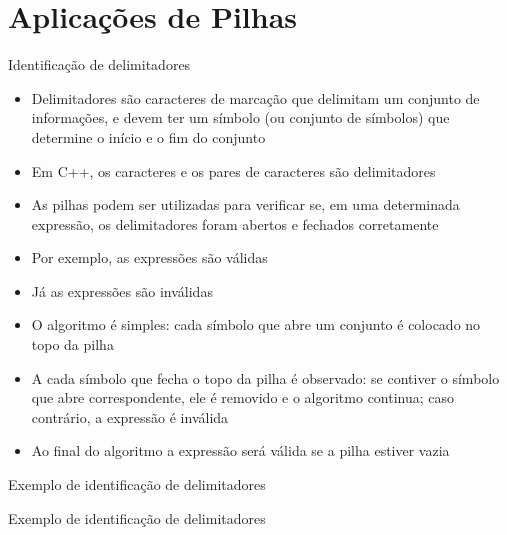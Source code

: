 \section{Aplicações de Pilhas}

\begin{frame}[fragile]{Identificação de delimitadores}

    \begin{itemize}
        \item Delimitadores são caracteres de marcação que delimitam um conjunto de informações,
            e devem ter um símbolo (ou conjunto de símbolos) que determine o início e o fim do
            conjunto

        \item Em C++, os caracteres  e os pares de caracteres  são delimitadores

        \item As pilhas podem ser utilizadas para verificar se, em uma determinada expressão,
            os delimitadores foram abertos e fechados corretamente

        \item Por exemplo, as expressões  são válidas

        \item Já as expressões \code{c}{[), )(, ()], [[][]} são inválidas

        \item O algoritmo é simples: cada símbolo que abre um conjunto é colocado no topo da
            pilha

        \item A cada símbolo que fecha o topo da pilha é observado: se contiver o símbolo que
            abre correspondente, ele é removido e o algoritmo continua; caso contrário, a 
            expressão é inválida

        \item Ao final do algoritmo a expressão será válida se a pilha estiver vazia

    \end{itemize}

\end{frame}

\begin{frame}[fragile]{Exemplo de identificação de delimitadores}
\end{frame}

\begin{frame}[fragile]{Exemplo de identificação de delimitadores}
\end{frame}

